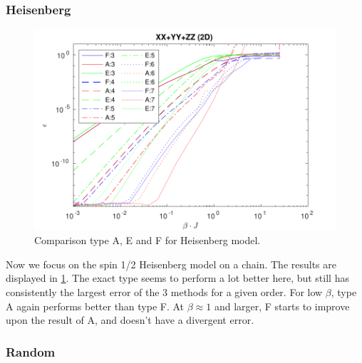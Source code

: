 \subsubsection{Heisenberg}

\begin{figure}[!htbp]
  \center
  \includegraphics[width=\textwidth]{Figuren/benchmarking/t_heis_XXX.pdf}
  \caption{Comparison type A, E and F for Heisenberg model.}
  \label{fig:benchmark:tHeisenberg}
\end{figure}

Now we focus on the spin 1/2 Heisenberg model on a chain. The results are displayed in \cref{fig:benchmark:tHeisenberg}. The exact type seems to perform a lot better here, but still has consistently the largest error of the 3 methods for a given order. For low $\beta$, type A again performs better than type F. At $\beta \approx 1$ and larger, F starts to improve upon the result of A, and doesn't have a divergent error.

\subsubsection{Random}

